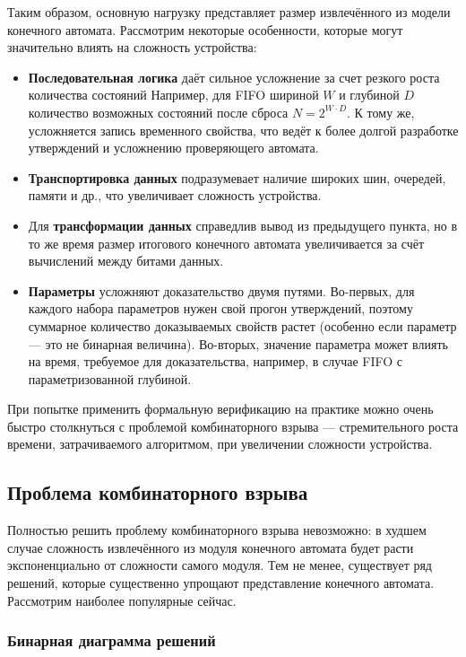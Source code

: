 Таким образом, основную нагрузку представляет размер извлечённого из модели конечного автомата. Рассмотрим некоторые особенности, которые могут значительно влиять на сложность устройства: 
\begin{itemize}
    \item \textbf{Последовательная логика} даёт сильное усложнение за счет резкого роста количества состояний Например, для FIFO шириной $W$ и глубиной $D$ количество возможных состояний после сброса $N = 2^{W \cdot D}$. К тому же, усложняется запись временного свойства, что ведёт к более долгой разработке утверждений и усложнению проверяющего автомата. 
    \item \textbf{Транспортировка данных} подразумевает наличие широких шин, очередей, памяти и др., что увеличивает сложность устройства.
    \item Для \textbf{трансформации данных} справедлив вывод из предыдущего пункта, но в то же время размер итогового конечного автомата увеличивается за счёт вычислений между битами данных.
    \item \textbf{Параметры} усложняют доказательство двумя путями. Во-первых, для каждого набора параметров нужен свой прогон утверждений, поэтому суммарное количество доказываемых свойств растет (особенно если параметр --- это не бинарная величина). Во-вторых, значение параметра может влиять на время, требуемое для доказательства, например, в случае FIFO с параметризованной глубиной.
\end{itemize}

При попытке применить формальную верификацию на практике можно очень быстро столкнуться с проблемой комбинаторного взрыва --- стремительного роста времени, затрачиваемого алгоритмом, при увеличении сложности устройства. 

\subsection{Проблема комбинаторного взрыва}

\tab Полностью решить проблему комбинаторного взрыва невозможно: в худшем случае сложность извлечённого из модуля конечного автомата будет расти экспоненциально от сложности самого модуля. Тем не менее, существует ряд решений, которые существенно упрощают представление конечного автомата\cite{state_exp_prob}. Рассмотрим наиболее популярные сейчас. 

\subsubsection{Бинарная диаграмма решений}


